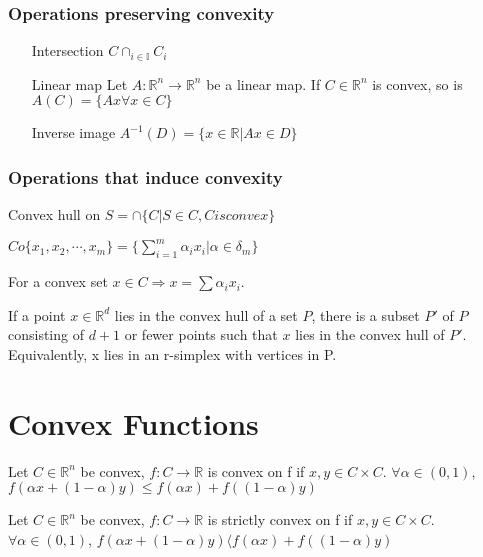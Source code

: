 \documentclass[11pt,fleqn]{book} %
\def\R{\mathbb{R}}
\begin{document}
\subsubsection{Operations preserving convexity}
\begin{itemize}
\item[Intersection] $C  \cap_{i \in \mathbb{I}}C_i$
\item[Linear map] Let $A : \mathbb{R}^n \to  \R^n$ be a linear map. If $C \in \R^n$ is convex, so is $A(C) = \{Ax \forall x \in C \}$
\item[Inverse image] $A^{-1}(D) = \{ x \in \R |Ax \in D \}$
\end{itemize}

\subsubsection{Operations that induce convexity}
Convex hull on $S = \cap \{C | S\in C, C is convex\}$\\
\begin{example}
$Co \{ x_1,x_2,\cdots,x_m\} = \{ \sum_{i=1}^m \alpha_i x_i | \alpha \in \delta_m \}$
\end{example}
For a convex set $x \in C \Rightarrow x = \sum \alpha_i x_i$. 
\begin{theorem}
If a point $x \in \R^d$ lies in the convex hull of a set $P$, there is a subset $P'$ of $P$ consisting of $d + 1$ or fewer points such that $x$ lies in the convex hull of $P'$. Equivalently, x lies in an r-simplex with vertices in P.
\end{theorem}

\section{Convex Functions}
\begin{definition}
Let $C \in \R^n$ be convex, $f:C \to \R$ is convex on f if $x,y \in C \times C$. $\forall \alpha \in (0,1)$, $f(\alpha x + (1-\alpha) y) \le f(\alpha x) + f((1-\alpha) y)$
\end{definition}

\begin{definition}
Let $C \in \R^n$ be convex, $f:C \to \R$ is strictly convex on f if $x,y \in C \times C$. $\forall \alpha \in (0,1)$, $f(\alpha x + (1-\alpha) y) \langle f(\alpha x) + f((1-\alpha) y)$
\end{definition}
\end{document}
